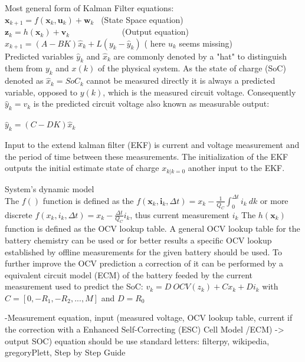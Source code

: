 Most general form of Kalman Filter equations: \\

$  {\boldsymbol {x}}_{k+1}=f({\boldsymbol {x}}_{k},{\boldsymbol {u}}_{k})+ {\boldsymbol {w}}_{k} $ \ (State Space equation)  \\
$  {\boldsymbol  {z}}_{{k}}=h({\boldsymbol  {x}}_{{k}})+{\boldsymbol  {v}}_{{k}} $ \ \ \ \ \ \ \ \ \ \ \  \ (Output equation)  \\


$ {\hat  {x}}_{k+1}=\left(A-BK\right){\hat  {x}}_{k}+L\left(y_{k}-{\hat  {y}}_{k}\right) $  ( here $u_{k}$ seems missing)\\

Predicted variables $ \hat{y}_{k}$ and $ \hat{x}_{k} $  are commonly denoted by a "hat" to distinguish them from  $ {y}_{k} $ and $ {x}(k) $  of the physical system. As the state of charge (SoC) denoted as $\hat{x}_{k} = SoC_{k}$  cannot be measured directly it is always a predicted variable, opposed to ${y}(k)$, which is the measured circuit voltage. Consequently $ \hat{y}_{k} = {v}_{k} $ is the predicted circuit voltage also known as measurable output: 

$ {\hat{y}}_{k}=\left(C-DK\right){\hat{x}}_{k} $ 

Input to the extend kalman filter (EKF) is current and voltage measurement and the period of time between these measurements. The initialization of the EKF outputs the initial estimate state of charge  ${x}_{k|k=0} $ another input to the EKF. 

{System's dynamic model} \\
The $f() $ function is defined as the $ f({\boldsymbol {x}}_{k},{\boldsymbol {i}}_{k},\Delta{t}) = {x}_{k} - \frac{1}{{Q_{C}}}\int_{0}^{\Delta t} {i_{k}\ dk} $ or more discrete $f({x}_{k},{i}_{k},\Delta{t}) = {x}_{k} - \frac{\Delta t}{Q_{C}} i_{k} $, thus current measurement $ {i}_{k} $ 
The $h({\boldsymbol {x}}_{{k}})$ function is defined as the OCV lookup table. A general OCV lookup table for the battery chemistry can be used or for better results a specific OCV lookup established by offline measurements for  the given battery should be used. 
To further improve the OCV prediction a correction of it can be performed by a equivalent circuit model (ECM) of the battery feeded by the current measurement used to predict the SoC: 
$ {v}_{k} = {D} \ {OCV}({z}_{k}) + C {x}_{k}  +  D {i}_{k}  $ 
with $ C = [0, -R_1, -R_2, ..., M] $ and $ D = R_0 $

-Measurement equation, input (measured voltage, OCV lookup table, current if the correction with a Enhanced Self-Correcting (ESC) Cell Model /ECM) -> output SOC)
equation should be use standard letters: filterpy, wikipedia, gregoryPlett, Step by Step Guide

